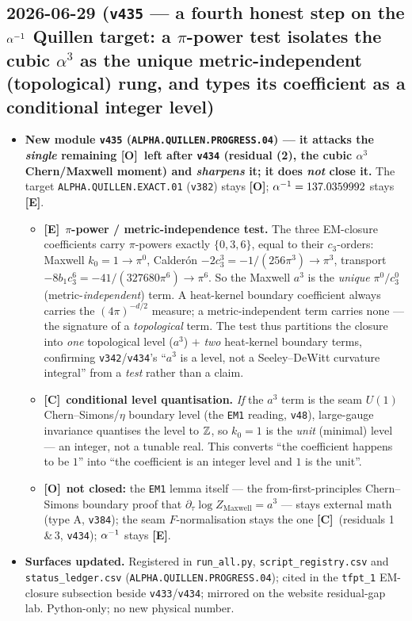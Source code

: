 \documentclass[11pt]{article}
\providecommand{\mE}{\textbf{[E]}}\providecommand{\mC}{\textbf{[C]}}
\providecommand{\mO}{\textbf{[O]}}\providecommand{\mX}{\textbf{[X]}}
\providecommand{\vref}[1]{\texttt{#1}}
\providecommand{\cthree}{c_3}\providecommand{\phiz}{\varphi_0^{\mathrm{ret}}}
\begin{document}
\subsection*{2026-06-29 (\texttt{v435} --- a fourth honest step on the $\alpha^{-1}$ Quillen target: a $\pi$-power test isolates the cubic $\alpha^3$ as the unique metric-independent (topological) rung, and types its coefficient as a conditional integer level)}
\begin{itemize}
\item \textbf{New module \texttt{v435} (\texttt{ALPHA.QUILLEN.PROGRESS.04}) --- it attacks the \emph{single}
remaining \mO\ left after \vref{v434} (residual (2), the cubic $\alpha^3$ Chern/Maxwell moment) and
\emph{sharpens} it; it does \emph{not} close it.} The target \texttt{ALPHA.QUILLEN.EXACT.01} (\vref{v382})
stays \mO; $\alpha^{-1}=137.0359992$ stays \mE.
\begin{itemize}
\item \mE\ \textbf{$\pi$-power / metric-independence test.} The three EM-closure coefficients carry
$\pi$-powers exactly $\{0,3,6\}$, equal to their $\cthree$-orders: Maxwell $k_0=1\to\pi^0$, Calder\'on
$-2\cthree^3=-1/(256\pi^3)\to\pi^3$, transport $-8b_1\cthree^6=-41/(327680\pi^6)\to\pi^6$. So the Maxwell
$a^3$ is the \emph{unique} $\pi^0/\cthree^0$ (metric-\emph{independent}) term. A heat-kernel boundary
coefficient always carries the $(4\pi)^{-d/2}$ measure; a metric-independent term carries none --- the
signature of a \emph{topological} term. The test thus partitions the closure into \emph{one} topological
level ($a^3$) $+$ \emph{two} heat-kernel boundary terms, confirming \vref{v342}/\vref{v434}'s ``$a^3$ is a
level, not a Seeley--DeWitt curvature integral'' from a \emph{test} rather than a claim.
\item \mC\ \textbf{conditional level quantisation.} \emph{If} the $a^3$ term is the seam $U(1)$
Chern--Simons/$\eta$ boundary level (the \texttt{EM1} reading, \vref{v48}), large-gauge invariance
quantises the level to $\mathbb{Z}$, so $k_0=1$ is the \emph{unit} (minimal) level --- an integer, not a tunable
real. This converts ``the coefficient happens to be $1$'' into ``the coefficient is an integer level and
$1$ is the unit''.
\item \mO\ \textbf{not closed:} the \texttt{EM1} lemma itself --- the from-first-principles Chern--Simons
boundary proof that $\partial_\tau\log Z_{\mathrm{Maxwell}}=a^3$ --- stays external math (type A, \vref{v384});
the seam $F$-normalisation stays the one \mC\ (residuals 1\,\&\,3, \vref{v434}); $\alpha^{-1}$ stays \mE.
\end{itemize}
\item \textbf{Surfaces updated.} Registered in \texttt{run\_all.py}, \texttt{script\_registry.csv} and
\texttt{status\_ledger.csv} (\texttt{ALPHA.QUILLEN.PROGRESS.04}); cited in the \texttt{tfpt\_1} EM-closure
subsection beside \vref{v433}/\vref{v434}; mirrored on the website residual-gap lab. Python-only; no new
physical number.
\end{itemize}
\end{document}
